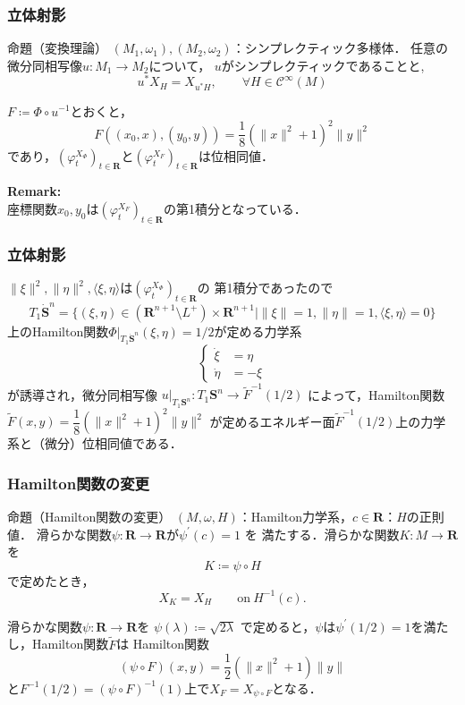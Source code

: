 \documentclass[11pt,%
dvipdfmx,cjk]{beamer}
\newcommand{\rr}{\mathbf{R}}
\def\inner<#1>{\langle #1 \rangle}
\begin{document}
\begin{frame}
\frametitle{立体射影}
\begin{block}{命題（変換理論）}
	\((M_{1}, \omega_{1}), (M_{2}, \omega_{2})\)：シンプレクティック多様体．
	任意の微分同相写像\(u\colon M_{1} \to M_{2}\)について，
	\(u\)がシンプレクティックであることと,
	\[
		u^{*}X_{H} = X_{u^{*}H}, \qquad \forall H \in \mathcal{C}^{\infty}(M)
	\]
\end{block}
\(F \coloneqq \Phi \circ u^{-1}\)とおくと，
\[
	F((x_{0},x),(y_{0},y)) = \frac{1}{8}(\|x\|^{2} + 1)^{2}\|y\|^{2}
\]
であり，\((\varphi_{t}^{X_{\Phi}})_{t \in \rr}\)と\((\varphi_{t}^{X_{F}})_{t \in \rr}\)は位相同値．

\textbf{Remark:}\\
座標関数\(x_{0}, y_{0}\)は\((\varphi_{t}^{X_{F}})_{t \in \rr}\)の第1積分となっている．
\end{frame}

\begin{frame}
\frametitle{立体射影}
\(\|\xi\|^{2}, \|\eta\|^{2}, \inner<\xi, \eta>\)は\((\varphi_{t}^{X_{\Phi}})_{t \in \rr}\)の
第1積分であったので
\[
	T_{1}\dot{\mathbf{S}}^{n} = 
 	\{ (\xi, \eta) \in (\rr^{n+1} \setminus L^{+}) \times \rr^{n+1} \mid
	\|\xi\| = 1, \|\eta\| = 1, \inner<\xi, \eta> = 0 \}
\]
上のHamilton関数\(\Phi|_{T_{1}\dot{\mathbf{S}}^{n}}(\xi, \eta) = 1/2\)が定める力学系
\[
\begin{cases}
	\dot{\xi} &=  \eta \\ 
	\dot{\eta} &= -\xi
\end{cases}	
\]
が誘導され，微分同相写像
\(u|_{T_{1}\mathbf{S}^{n}}: T_{1}\mathbf{S}^{n} \to \tilde{F}^{-1}(1/2)\)
によって，Hamilton関数\(\tilde{F}(x,y) = \dfrac{1}{8}(\|x\|^{2} + 1)^{2}\|y\|^{2} \)
が定めるエネルギー面\(\tilde{F}^{-1}(1/2)\)上の力学系と（微分）位相同値である．
\end{frame}

\begin{frame}
\frametitle{Hamilton関数の変更}
\begin{block}{命題（Hamilton関数の変更）}
	\((M, \omega, H)\)：Hamilton力学系，\(c \in \rr\)：\(H\)の正則値．
	滑らかな関数\(\psi\colon \rr \to \rr\)が\(\psi^{\prime}(c) = 1\) を
	満たする．滑らかな関数\(K\colon M \to \rr\)を
	\[
		K \coloneqq \psi \circ H
	\]
	で定めたとき，
	\[
		X_{K} = X_{H}\qquad \text{on}\ H^{-1}(c).
	\]
\end{block}
滑らかな関数\( \psi\colon \rr \to \rr\)を
\(
	\psi(\lambda) \coloneqq \sqrt{2 \lambda}
\)
で定めると，\(\psi\)は\(\psi^{\prime}(1/2) = 1\)を満たし，Hamilton関数\(\tilde{F}\)は
Hamilton関数
\[
	(\psi \circ F)(x,y) = \frac{1}{2}(\|x\|^{2} + 1)\|y\|
\]
と\(F^{-1}(1/2) = (\psi \circ F)^{-1}(1)\)上で\(X_{F} = X_{\psi \circ F}\)となる．
\end{frame}
\end{document}
